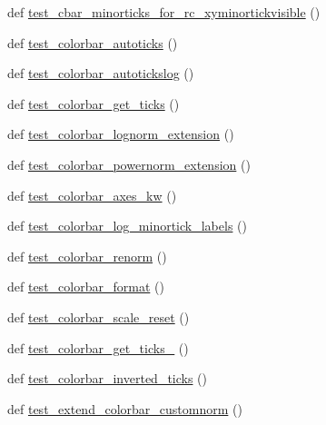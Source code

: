 \begin{DoxyCompactItemize}
\item 
def \hyperlink{namespacematplotlib_1_1tests_1_1test__colorbar_a69f78f17b38eedd322a0222cfd275d19}{test\+\_\+cbar\+\_\+minorticks\+\_\+for\+\_\+rc\+\_\+xyminortickvisible} ()
\item 
def \hyperlink{namespacematplotlib_1_1tests_1_1test__colorbar_aa2b6d66df5e0bb3f80596efbea83192d}{test\+\_\+colorbar\+\_\+autoticks} ()
\item 
def \hyperlink{namespacematplotlib_1_1tests_1_1test__colorbar_a62976ddcb685fc269ba350c3162721e1}{test\+\_\+colorbar\+\_\+autotickslog} ()
\item 
def \hyperlink{namespacematplotlib_1_1tests_1_1test__colorbar_a56b60d0d8a2eb9b195b5104785f45fd1}{test\+\_\+colorbar\+\_\+get\+\_\+ticks} ()
\item 
def \hyperlink{namespacematplotlib_1_1tests_1_1test__colorbar_a73751e765c837871a442f0fae30959d7}{test\+\_\+colorbar\+\_\+lognorm\+\_\+extension} ()
\item 
def \hyperlink{namespacematplotlib_1_1tests_1_1test__colorbar_a7e38bcbf81b03dec24190163420b12f1}{test\+\_\+colorbar\+\_\+powernorm\+\_\+extension} ()
\item 
def \hyperlink{namespacematplotlib_1_1tests_1_1test__colorbar_acd061ad0454f9e212166e656880bd1b0}{test\+\_\+colorbar\+\_\+axes\+\_\+kw} ()
\item 
def \hyperlink{namespacematplotlib_1_1tests_1_1test__colorbar_a1d6b4f74173c033a7f4bff9d8bc43007}{test\+\_\+colorbar\+\_\+log\+\_\+minortick\+\_\+labels} ()
\item 
def \hyperlink{namespacematplotlib_1_1tests_1_1test__colorbar_aba9597478144cbcb1a6a147010e62551}{test\+\_\+colorbar\+\_\+renorm} ()
\item 
def \hyperlink{namespacematplotlib_1_1tests_1_1test__colorbar_a4fed5c2433ed393525c7be9ef58ad232}{test\+\_\+colorbar\+\_\+format} ()
\item 
def \hyperlink{namespacematplotlib_1_1tests_1_1test__colorbar_aa62d5a857579ecf9fb7bd35756ec61c9}{test\+\_\+colorbar\+\_\+scale\+\_\+reset} ()
\item 
def \hyperlink{namespacematplotlib_1_1tests_1_1test__colorbar_a17065c88ded75e5434cf3a32e51c7adc}{test\+\_\+colorbar\+\_\+get\+\_\+ticks\+\_} ()
\item 
def \hyperlink{namespacematplotlib_1_1tests_1_1test__colorbar_ab495811cf99454f3d1774fffd38931ec}{test\+\_\+colorbar\+\_\+inverted\+\_\+ticks} ()
\item 
def \hyperlink{namespacematplotlib_1_1tests_1_1test__colorbar_a6cb61f8dc99478f09a86393177679e6e}{test\+\_\+extend\+\_\+colorbar\+\_\+customnorm} ()

\end{DoxyCompactItemize}
